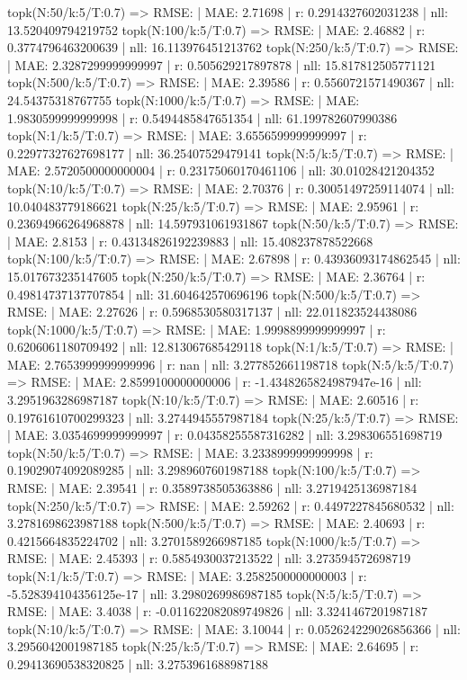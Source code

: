 topk(N:50/k:5/T:0.7) => RMSE: | MAE: 2.71698 | r: 0.2914327602031238 | nll: 13.520409794219752
topk(N:100/k:5/T:0.7) => RMSE: | MAE: 2.46882 | r: 0.3774796463200639 | nll: 16.113976451213762
topk(N:250/k:5/T:0.7) => RMSE: | MAE: 2.3287299999999997 | r: 0.505629217897878 | nll: 15.817812505771121
topk(N:500/k:5/T:0.7) => RMSE: | MAE: 2.39586 | r: 0.5560721571490367 | nll: 24.54375318767755
topk(N:1000/k:5/T:0.7) => RMSE: | MAE: 1.9830599999999998 | r: 0.5494485847651354 | nll: 61.199782607990386
topk(N:1/k:5/T:0.7) => RMSE: | MAE: 3.6556599999999997 | r: 0.22977327627698177 | nll: 36.25407529479141
topk(N:5/k:5/T:0.7) => RMSE: | MAE: 2.5720500000000004 | r: 0.23175060170461106 | nll: 30.01028421204352
topk(N:10/k:5/T:0.7) => RMSE: | MAE: 2.70376 | r: 0.30051497259114074 | nll: 10.040483779186621
topk(N:25/k:5/T:0.7) => RMSE: | MAE: 2.95961 | r: 0.23694966264968878 | nll: 14.597931061931867
topk(N:50/k:5/T:0.7) => RMSE: | MAE: 2.8153 | r: 0.43134826192239883 | nll: 15.408237878522668
topk(N:100/k:5/T:0.7) => RMSE: | MAE: 2.67898 | r: 0.43936093174862545 | nll: 15.017673235147605
topk(N:250/k:5/T:0.7) => RMSE: | MAE: 2.36764 | r: 0.49814737137707854 | nll: 31.604642570696196
topk(N:500/k:5/T:0.7) => RMSE: | MAE: 2.27626 | r: 0.5968530580317137 | nll: 22.011823524438086
topk(N:1000/k:5/T:0.7) => RMSE: | MAE: 1.9998899999999997 | r: 0.6206061180709492 | nll: 12.813067685429118
topk(N:1/k:5/T:0.7) => RMSE: | MAE: 2.7653999999999996 | r: nan | nll: 3.277852661198718
topk(N:5/k:5/T:0.7) => RMSE: | MAE: 2.8599100000000006 | r: -1.4348265824987947e-16 | nll: 3.2951963286987187
topk(N:10/k:5/T:0.7) => RMSE: | MAE: 2.60516 | r: 0.19761610700299323 | nll: 3.2744945557987184
topk(N:25/k:5/T:0.7) => RMSE: | MAE: 3.0354699999999997 | r: 0.04358255587316282 | nll: 3.298306551698719
topk(N:50/k:5/T:0.7) => RMSE: | MAE: 3.2338999999999998 | r: 0.19029074092089285 | nll: 3.2989607601987188
topk(N:100/k:5/T:0.7) => RMSE: | MAE: 2.39541 | r: 0.3589738505363886 | nll: 3.2719425136987184
topk(N:250/k:5/T:0.7) => RMSE: | MAE: 2.59262 | r: 0.4497227845680532 | nll: 3.2781698623987188
topk(N:500/k:5/T:0.7) => RMSE: | MAE: 2.40693 | r: 0.4215664835224702 | nll: 3.2701589266987185
topk(N:1000/k:5/T:0.7) => RMSE: | MAE: 2.45393 | r: 0.5854930037213522 | nll: 3.273594572698719
topk(N:1/k:5/T:0.7) => RMSE: | MAE: 3.2582500000000003 | r: -5.528394104356125e-17 | nll: 3.2980269986987185
topk(N:5/k:5/T:0.7) => RMSE: | MAE: 3.4038 | r: -0.011622082089749826 | nll: 3.3241467201987187
topk(N:10/k:5/T:0.7) => RMSE: | MAE: 3.10044 | r: 0.052624229026856366 | nll: 3.2956042001987185
topk(N:25/k:5/T:0.7) => RMSE: | MAE: 2.64695 | r: 0.29413690538320825 | nll: 3.2753961688987188
